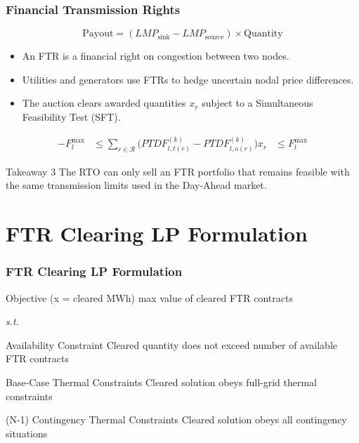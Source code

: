 \documentclass[
    11pt,
]{beamer}
\begin{document}
\begin{frame}
    \frametitle{Financial Transmission Rights}
    \small

    \[
        \text{Payout} = (LMP_{\text{sink}} - LMP_{\text{source}})\times \text{Quantity}
    \]

    \begin{itemize}
        \item An FTR is a financial right on congestion between two nodes.
        \item Utilities and generators use FTRs to hedge uncertain nodal price differences.
        \item The auction clears awarded quantities $x_r$ subject to a Simultaneous Feasibility Test (SFT).
    \end{itemize}

    {\scriptsize
    \[
    \begin{aligned}
    -F_l^{\max}
    &\le
    \sum_{r\in\mathcal{R}} \big(PTDF^{(k)}_{l,t(r)} - PTDF^{(k)}_{l,o(r)}\big)x_r &\le F_l^{\max}
    \end{aligned}
    \]
    }

    \begin{block}{Takeaway 3}
        The RTO can only sell an FTR portfolio that remains feasible with the same transmission limits used in the Day-Ahead market.
    \end{block}
\end{frame}


\section{FTR Clearing LP Formulation}

\begin{frame}
\frametitle{FTR Clearing LP Formulation}

    \begin{alertblock}{Objective (x = cleared MWh)}
        max value of cleared FTR contracts
    \end{alertblock}

    \textit{s.t.}

    \begin{block}{Availability Constraint}
        Cleared quantity does not exceed number of available FTR contracts
    \end{block}
    \begin{exampleblock}{Base-Case Thermal Constraints}
        Cleared solution obeys full-grid thermal constraints
    \end{exampleblock}
    \begin{block}{(N-1) Contingency Thermal Constraints}
        Cleared solution obeys all contingency situations
    \end{block}
    
\end{frame}
\end{document}
